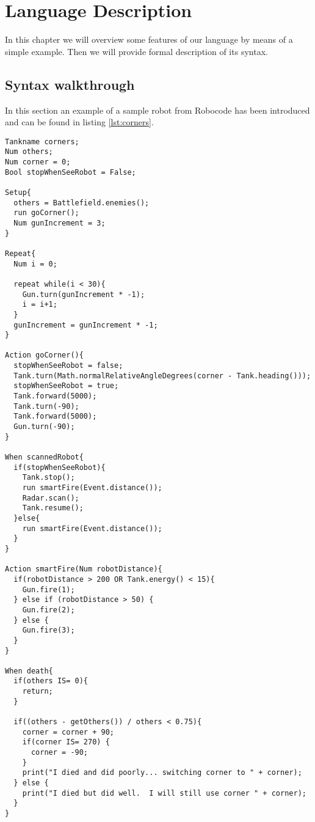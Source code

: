 \chapter{Language Description}
\label{chap:LanguageDescription}
In this chapter we will overview some features of our language by means of a simple example. Then we will provide formal description of its syntax. 

\section{Syntax walkthrough}
In this section an example of a sample robot from Robocode has been introduced and can be found in listing \ref{lst:corners}.

\label{lst:corners}
\begin{lstlisting}[caption={Eksampel of the sample robot "Corners" in our language}]
Tankname corners;
Num others;
Num corner = 0;
Bool stopWhenSeeRobot = False;

Setup{
  others = Battlefield.enemies();  
  run goCorner();	 
  Num gunIncrement = 3;
}

Repeat{  
  Num i = 0;
  
  repeat while(i < 30){
    Gun.turn(gunIncrement * -1);
    i = i+1;
  }  
  gunIncrement = gunIncrement * -1;
}

Action goCorner(){
  stopWhenSeeRobot = false;  
  Tank.turn(Math.normalRelativeAngleDegrees(corner - Tank.heading()));      
  stopWhenSeeRobot = true;
  Tank.forward(5000);
  Tank.turn(-90);
  Tank.forward(5000);
  Gun.turn(-90);
}

When scannedRobot{
  if(stopWhenSeeRobot){
    Tank.stop();                                     
    run smartFire(Event.distance());
    Radar.scan();                                     
    Tank.resume();                                   
  }else{
    run smartFire(Event.distance());
  }
}

Action smartFire(Num robotDistance){
  if(robotDistance > 200 OR Tank.energy() < 15){
    Gun.fire(1);
  } else if (robotDistance > 50) {
    Gun.fire(2);
  } else {
    Gun.fire(3);
  }
}

When death{
  if(others IS= 0){
    return;
  }
  
  if((others - getOthers()) / others < 0.75){
    corner = corner + 90;
    if(corner IS= 270) {
      corner = -90;
    }
    print("I died and did poorly... switching corner to " + corner);
  } else {
    print("I died but did well.  I will still use corner " + corner);
  }
}
\end{lstlisting}


